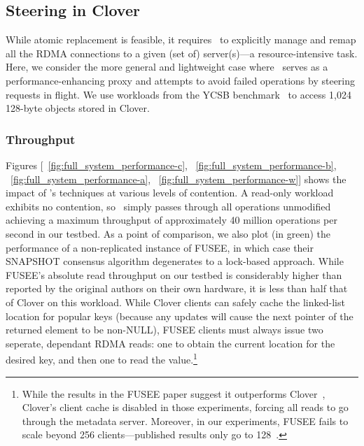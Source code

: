 \subsection{Steering in Clover}

While atomic replacement is feasible, it requires \sword\ to
explicitly manage and remap all the RDMA connections to a given (set
of) server(s)---a resource-intensive task.  Here, we consider the more
general and lightweight case where \sword\ serves as a
performance-enhancing proxy and attempts to avoid failed operations by
steering requests in flight.  We use workloads from the YCSB
benchmark~\cite{ycsb} to access 1,024 128-byte objects stored in Clover.  


\subsubsection{Throughput}

Figures [~\ref{fig:full_system_performance-c}, ~\ref{fig:full_system_performance-b}, ~\ref{fig:full_system_performance-a}, ~\ref{fig:full_system_performance-w}] shows the impact of \sword's
techniques at various levels of contention.  A read-only workload
exhibits no contention, so \sword\ simply passes through all
operations unmodified achieving a maximum throughput of approximately
40 million operations per second in our testbed.  As a point of
comparison, we also plot (in green) the performance of a
non-replicated instance of FUSEE, in which case their SNAPSHOT consensus algorithm
degenerates to a lock-based approach.  While FUSEE's absolute read
throughput on our testbed is considerably higher than reported by the
original authors on their own hardware, it is less than half that of
Clover on this workload.  While Clover clients can safely cache the
linked-list location for popular keys (because any updates will cause
the next pointer of the returned element to be non-NULL), FUSEE
clients must always issue two seperate, dependant RDMA reads: one to
obtain the current location for the desired key, and then one to read
the value.\footnote{While
the results in the FUSEE paper suggest it outperforms
Clover~\cite[Figs. 13--15]{fusee}, Clover's
client cache is disabled in those experiments, forcing all reads to go through the metadata server.  Moreover, in our experiments, FUSEE fails to scale beyond 256 clients---published results only go to 128~\cite{fusee}.}

